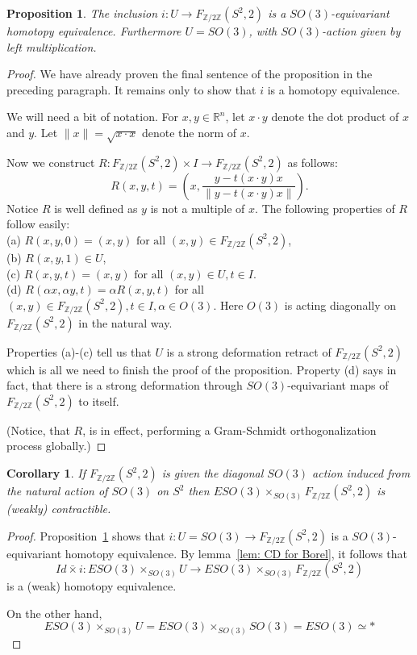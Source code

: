 \documentclass{amsart}
\newtheorem{prop}[thm]{Proposition}
\newtheorem{cor}[thm]{Corollary}
\newcommand{\RR}{\mathbb{R}}
\newcommand{\Ztwo}{\mathbb{Z}/2\mathbb{Z}}
\begin{document}
\begin{prop}
\label{pro: gramschmidtS^2}
The inclusion $i: U \rightarrow F_{\Ztwo}(S^2,2)$ is a 
$SO(3)$-equivariant homotopy
equivalence. Furthermore $U=SO(3)$, with $SO(3)$-action given
by left multiplication.
\end{prop}
\begin{proof}
We have already proven the final sentence of the proposition
 in the preceding paragraph.
It remains only to show that $i$ is a homotopy equivalence. 

We will need a bit of notation. For $x,y \in \RR^n$, let $x \cdot y$ denote
the dot product of $x$ and $y$. Let $\parallel x \parallel = 
\sqrt{x \cdot x}$ denote the norm of $x$.

Now we construct $R: F_{\Ztwo}(S^2,2) \times I \rightarrow F_{\Ztwo}(S^2,2)$
as follows:
$$
R(x,y,t) = (x, \frac{y-t(x \cdot y) x}{\parallel y-t(x \cdot y)x \parallel}).
$$
Notice $R$ is well defined as $y$ is not a multiple of $x$.
The following properties of $R$ follow easily: \\
(a) $R(x,y,0) = (x,y) \text{ for all } (x,y) \in F_{\Ztwo}(S^2,2)$, \\
(b) $R(x,y,1) \in U$, \\
(c) $R(x,y,t) = (x,y) \text{ for all } (x,y) \in U, t \in I$. \\
(d) $R(\alpha x, \alpha y, t) = \alpha R(x,y,t)$ for all $(x,y) \in 
F_{\Ztwo}(S^2,2), t \in I, \alpha \in O(3)$. Here $O(3)$ is acting
diagonally on $F_{\Ztwo}(S^2,2)$ in the natural way.

Properties (a)-(c) tell us that $U$ is a strong deformation retract
of $F_{\Ztwo}(S^2,2)$ which is all we need to finish the proof
of the proposition. Property (d) says in fact, that there is a
strong deformation through $SO(3)$-equivariant maps of $F_{\Ztwo}(S^2,2)$
to itself.

(Notice, that $R$, is in effect, performing a Gram-Schmidt orthogonalization
process globally.)
\end{proof}

\begin{cor}
\label{cor: orbS^22}
If $F_{\Ztwo}(S^2,2)$ is given the diagonal $SO(3)$ action induced
from the natural action of $SO(3)$ on $S^2$ then 
$ESO(3) \times_{SO(3)} F_{\Ztwo}(S^2,2)$ is (weakly) contractible.
\end{cor}
\begin{proof}
Proposition~\ref{pro: gramschmidtS^2} shows that 
$i: U=SO(3) \rightarrow F_{\Ztwo}(S^2,2)$ is a $SO(3)$-equivariant
homotopy equivalence. 
By lemma~\ref{lem: CD for Borel}, it follows that
$$
Id \bar{\times} i: ESO(3) \times_{SO(3)} U \rightarrow
ESO(3) \times_{SO(3)} F_{\Ztwo}(S^2,2)
$$
is a (weak) homotopy equivalence.

On the other hand,
$$
	ESO(3) \times_{SO(3)} U = ESO(3) \times_{SO(3)} SO(3) 
= ESO(3) \simeq * 
$$

\end{proof}
\end{document}
